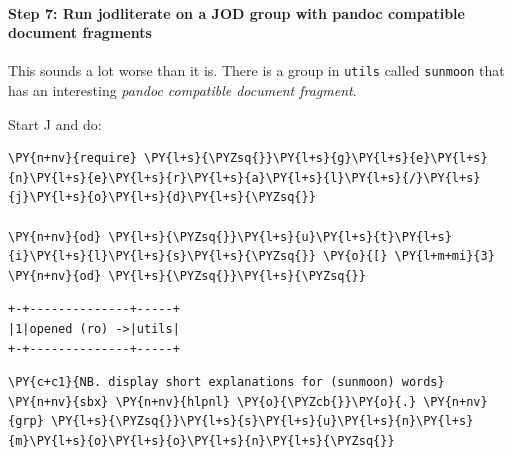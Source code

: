     \hypertarget{step-7-run-jodliterate-on-a-jod-group-with-pandoc-compatible-document-fragments}{%
\paragraph{Step 7: Run jodliterate on a JOD group with pandoc compatible
document
fragments}\label{step-7-run-jodliterate-on-a-jod-group-with-pandoc-compatible-document-fragments}}

This sounds a lot worse than it is. There is a group in \texttt{utils}
called \texttt{sunmoon} that has an interesting \emph{pandoc compatible
document fragment}.

Start J and do:

    \begin{tcolorbox}[breakable, size=fbox, boxrule=1pt, pad at break*=1mm,colback=cellbackground, colframe=cellborder]
\begin{Verbatim}[commandchars=\\\{\}]
\PY{n+nv}{require} \PY{l+s}{\PYZsq{}}\PY{l+s}{g}\PY{l+s}{e}\PY{l+s}{n}\PY{l+s}{e}\PY{l+s}{r}\PY{l+s}{a}\PY{l+s}{l}\PY{l+s}{/}\PY{l+s}{j}\PY{l+s}{o}\PY{l+s}{d}\PY{l+s}{\PYZsq{}}

\PY{n+nv}{od} \PY{l+s}{\PYZsq{}}\PY{l+s}{u}\PY{l+s}{t}\PY{l+s}{i}\PY{l+s}{l}\PY{l+s}{s}\PY{l+s}{\PYZsq{}} \PY{o}{[} \PY{l+m+mi}{3} \PY{n+nv}{od} \PY{l+s}{\PYZsq{}}\PY{l+s}{\PYZsq{}}
\end{Verbatim}
\end{tcolorbox}

    \begin{Verbatim}[commandchars=\\\{\}]
+-+--------------+-----+
|1|opened (ro) ->|utils|
+-+--------------+-----+
    \end{Verbatim}

    \begin{tcolorbox}[breakable, size=fbox, boxrule=1pt, pad at break*=1mm,colback=cellbackground, colframe=cellborder]
\begin{Verbatim}[commandchars=\\\{\}]
\PY{c+c1}{NB. display short explanations for (sunmoon) words}
\PY{n+nv}{sbx} \PY{n+nv}{hlpnl} \PY{o}{\PYZcb{}}\PY{o}{.} \PY{n+nv}{grp} \PY{l+s}{\PYZsq{}}\PY{l+s}{s}\PY{l+s}{u}\PY{l+s}{n}\PY{l+s}{m}\PY{l+s}{o}\PY{l+s}{o}\PY{l+s}{n}\PY{l+s}{\PYZsq{}}
\end{Verbatim}
\end{tcolorbox}

